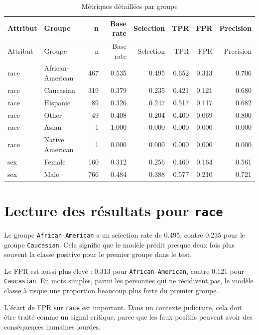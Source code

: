 \documentclass[12pt,a4paper]{report}
\begin{document}
\begingroup
\scriptsize
\setlength{\tabcolsep}{3pt}
\begin{longtable}{@{}llrrrrrr@{}}
\caption{Métriques détaillées par groupe}\\
\toprule
Attribut & Groupe & n & Base rate & Selection & TPR & FPR & Precision \\
\midrule
\endfirsthead
\toprule
Attribut & Groupe & n & Base rate & Selection & TPR & FPR & Precision \\
\midrule
\endhead
race & African-American & 467 & 0.535 & 0.495 & 0.652 & 0.313 & 0.706 \\
race & Caucasian & 319 & 0.379 & 0.235 & 0.421 & 0.121 & 0.680 \\
race & Hispanic & 89 & 0.326 & 0.247 & 0.517 & 0.117 & 0.682 \\
race & Other & 49 & 0.408 & 0.204 & 0.400 & 0.069 & 0.800 \\
race & Asian & 1 & 1.000 & 0.000 & 0.000 & 0.000 & 0.000 \\
race & Native American & 1 & 0.000 & 0.000 & 0.000 & 0.000 & 0.000 \\
sex & Female & 160 & 0.312 & 0.256 & 0.460 & 0.164 & 0.561 \\
sex & Male & 766 & 0.484 & 0.388 & 0.577 & 0.210 & 0.721 \\
\bottomrule
\end{longtable}
\endgroup

\section{Lecture des résultats pour \texttt{race}}

Le groupe \texttt{African-American} a un selection rate de 0.495, contre 0.235 pour le groupe \texttt{Caucasian}. Cela signifie que le modèle prédit presque deux fois plus souvent la classe positive pour le premier groupe dans le test.

Le FPR est aussi plus élevé : 0.313 pour \texttt{African-American}, contre 0.121 pour \texttt{Caucasian}. En mots simples, parmi les personnes qui ne récidivent pas, le modèle classe à risque une proportion beaucoup plus forte du premier groupe.

\begin{tcolorbox}[dangerbox, title={Point le plus préoccupant}]
L'écart de FPR sur \texttt{race} est important. Dans un contexte judiciaire, cela doit être traité comme un signal critique, parce que les faux positifs peuvent avoir des conséquences humaines lourdes.
\end{tcolorbox}
\end{document}
